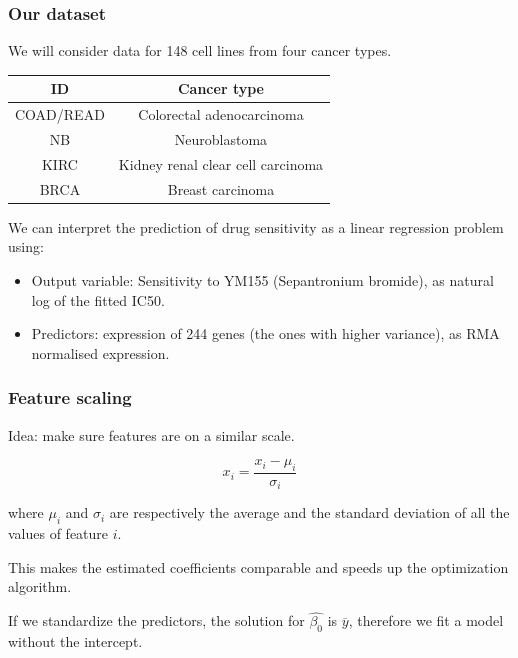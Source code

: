 \documentclass[notes]{beamer}          %
\begin{document}
\begin{frame}
\frametitle{Our dataset}

We will consider data for 148 cell lines from four cancer types.

\begin{center}
\begin{tabular}{ |c|c| } 
 \hline
 ID & Cancer type \\
 \hline
 COAD/READ & Colorectal adenocarcinoma \\ 
 NB & Neuroblastoma \\ 
 KIRC & Kidney renal clear cell carcinoma \\ 
 BRCA & Breast carcinoma \\
 \hline
\end{tabular}
\end{center}

We can interpret the prediction of drug sensitivity as a linear regression problem using:

\begin{itemize}
    \item Output variable: Sensitivity to YM155 (Sepantronium bromide), as natural log of the fitted IC50. 
    \item Predictors: expression of 244 genes (the ones with higher variance), as RMA normalised expression.
\end{itemize}

\end{frame}

\begin{frame}
\frametitle{Feature scaling}

Idea: make sure features are on a similar scale.

\begin{equation*}
x_i = \frac{x_i-\mu_i}{\sigma_i}
\end{equation*}

where $\mu_i$ and $\sigma_i$ are respectively the average and the standard deviation of all the values of feature $i$.

\vspace{5mm}

This makes the estimated coefficients comparable and speeds up the optimization algorithm.

\vspace{5mm} 

If we standardize the predictors, the solution for $\hat{\beta_0}$ is $\overline{y}$, therefore we fit a model without the intercept.

\end{frame}
\end{document}
